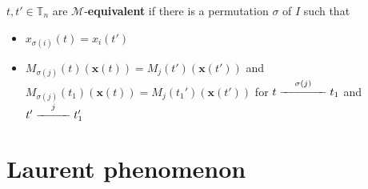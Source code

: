 \documentclass[main]{subfiles}
\begin{document}
\begin{definition}\label{M-equivalence}
$t,t'\in\mathbb T_n$ are $\mathcal M$-\textbf{equivalent} if there is a permutation $\sigma$ of $I$ such that
\begin{itemize}
\item $x_{\sigma(i)}(t)=x_{i}(t')$
\item $M_{\sigma(j)}(t)(\mathbf x(t))=M_{j}(t')(\mathbf x(t'))$ and $M_{\sigma(j)}(t_1)(\mathbf x(t))=M_{j}(t_1')(\mathbf x(t'))$ for $t\xedge{\sigma(j)}t_1$ and $t'\xedge{j}t_1'$
\end{itemize}
\end{definition}



\section{Laurent phenomenon}
\end{document}
